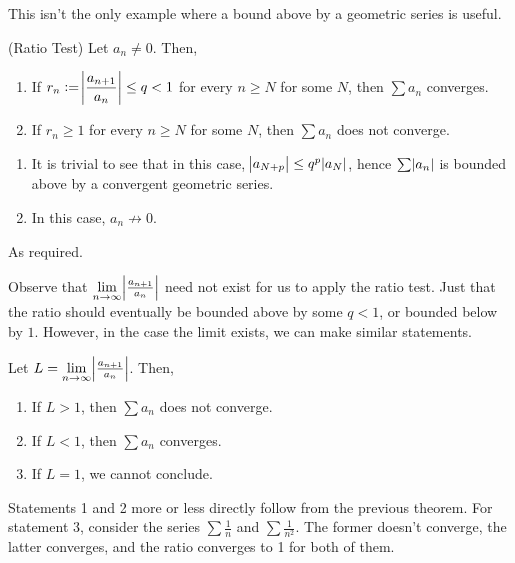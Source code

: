 This isn't the only example where a bound above by a geometric series is useful.
\begin{SWP}{\thm}{(Ratio Test) Let $a_n \neq 0$. Then,
\begin{enumerate}
	\item If $r_n := \abs{\dfrac{a_{n + 1}}{a_n}} \leq q < 1$ for every $n \geq N$ for some $N$, then $\sum a_n$ converges.
	\item If $r_n \geq 1$ for every $n \geq N$ for some $N$, then $\sum a_n$ does not converge.
\end{enumerate}
}\begin{enumerate}\item It is trivial to see that in this case, $\abs {a_{N + p}} \leq q^p \abs{a_N}$, hence $\sum \abs{a_n}$ is bounded above by a convergent geometric series.
\item In this case, $a_n \not \to 0$.\end{enumerate}As required.\end{SWP}Observe that $\lim\limits_{n\to \infty} \abs{\frac{a_{n + 1}}{a_n}}$ need not exist for us to apply the ratio test. Just that the ratio should eventually be bounded above by some $q < 1$, or bounded below by $1$. However, in the case the limit exists, we can make similar statements.
\begin{SNP}{\crl}Let $L = \lim\limits_{n\to\infty}\abs{\frac{a_{n + 1}}{a_n}}$. Then,
\begin{enumerate}
	\item If $L > 1$, then $\sum a_n$ does not converge.
	\item If $L < 1$, then $\sum a_n$ converges.
	\item If $L = 1$, we cannot conclude.
\end{enumerate}
\end{SNP}
Statements 1 and 2 more or less directly follow from the previous theorem. For statement 3, consider the series $\sum \frac 1 n$ and $\sum \frac {1} {n^2}$. The former doesn't converge, the latter converges, and the ratio converges to 1 for both of them.


